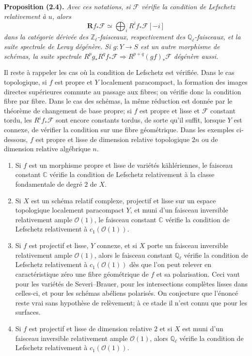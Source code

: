 \documentclass[11pt]{article}
\newcommand{\cF}{\mathcal F}
\newcommand{\cO}{\mathcal O}
\newcommand{\bR}{\mathbf R}
\newcommand{\C}{\mathbb C}
\newcommand{\Ql}{\mathbb Q_\ell}
\newcommand{\Zl}{\mathbb Z_\ell}
\newenvironment{named}[1]{\par\medskip\noindent\textbf{#1}\itshape}{\par\medskip}
\begin{document}
\begin{named}{Proposition (2.4).}
Avec ces notations, si $\cF$ vérifie la condition de Lefschetz relativement à $u$, alors
\begin{equation}\tag{2.5}
\bR f_*\cF\simeq\bigoplus_i R^if_*\cF[-i]
\end{equation}
dans la catégorie dérivée des $\Zl$-faisceaux, respectivement des $\Ql$-faisceaux, et la suite spectrale de Leray dégénère. Si $g:Y\to S$ est un autre morphisme de schémas, la suite spectrale $R^pg_*R^qf_*\cF\Rightarrow R^{p+q}(gf)_*\cF$ dégénère aussi.
\end{named}

Il reste à rappeler les cas où la condition de Lefschetz est vérifiée. Dans le cas topologique, si $f$ est propre et $Y$ localement paracompact, la formation des images directes supérieures commute au passage aux fibres; on vérifie donc la condition fibre par fibre. Dans le cas des schémas, la même réduction est donnée par le théorème de changement de base propre; si $f$ est propre et lisse et $\cF$ constant tordu, les $R^if_*\cF$ sont encore constants tordus, de sorte qu'il suffit, lorsque $Y$ est connexe, de vérifier la condition sur une fibre géométrique. Dans les exemples ci-dessous, $f$ est propre et lisse de dimension relative topologique $2n$ ou de dimension relative algébrique $n$.

\begin{enumerate}[label=(2.6.\arabic*)]
\item Si $f$ est un morphisme propre et lisse de variétés kählériennes, le faisceau constant $\C$ vérifie la condition de Lefschetz relativement à la classe fondamentale de degré $2$ de $X$.
\item Si $X$ est un schéma relatif complexe, projectif et lisse sur un espace topologique localement paracompact $Y$, et muni d'un faisceau inversible relativement ample $\cO(1)$, le faisceau constant $\C$ vérifie la condition de Lefschetz relativement à $c_1(\cO(1))$.
\item Si $f$ est projectif et lisse, $Y$ connexe, et si $X$ porte un faisceau inversible relativement ample $\cO(1)$, alors le faisceau constant $\Ql$ vérifie la condition de Lefschetz relativement à $c_1(\cO(1))$ dès que l'on peut relever en caractéristique zéro une fibre géométrique de $f$ et sa polarisation. Ceci vaut pour les variétés de Severi--Brauer, pour les intersections complètes lisses dans celles-ci, et pour les schémas abéliens polarisés. On conjecture que l'énoncé reste vrai sans hypothèse de relèvement; à ce stade il n'est connu que pour les surfaces.
\item Si $f$ est projectif et lisse de dimension relative $2$ et si $X$ est muni d'un faisceau inversible relativement ample $\cO(1)$, alors $\Ql$ vérifie la condition de Lefschetz relativement à $c_1(\cO(1))$.
\end{enumerate}
\end{document}
